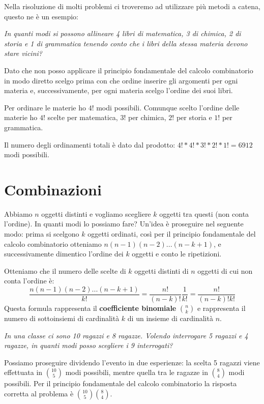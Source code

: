 Nella risoluzione di molti problemi ci troveremo ad utilizzare più metodi a catena, questo ne è un esempio:
\begin{Example}{}{}
    \textit{In quanti modi si possono allineare 4 libri di matematica, 3 di chimica, 2 di storia e 1 di grammatica tenendo conto che i libri della stessa materia devono stare vicini?}

    Dato che non posso applicare il principio fondamentale del calcolo combinatorio in modo diretto scelgo prima con che ordine inserire gli argomenti per ogni materia e, successivamente, per ogni materia scelgo l'ordine dei suoi libri.

    Per ordinare le materie ho $4!$ modi possibili. Comunque scelto l'ordine delle materie ho $4!$ scelte per matematica, $3!$ per chimica, $2!$ per storia e $1!$ per grammatica.

    Il numero degli ordinamenti totali è dato dal prodotto: $4!*4!*3!*2!*1!=6912$ modi possibili.   
\end{Example}

\section{Combinazioni}
Abbiamo $n$ oggetti distinti e vogliamo scegliere $k$ oggetti tra questi (non conta l'ordine). In quanti modi lo possiamo fare? Un'idea è proseguire nel seguente modo: prima si scelgono $k$ oggetti ordinati, così per il principio fondamentale del calcolo combinatorio otteniamo $n(n-1)(n-2)...(n-k+1)$, e successivamente dimentico l'ordine dei $k$ oggetti e conto le ripetizioni.
\begin{redbar}
    Otteniamo che il numero delle scelte di $k$ oggetti distinti di $n$ oggetti di cui non conta l'ordine è:
    \begin{equation*}
        \frac{n(n-1)(n-2)...(n-k+1)}{k!}=\frac{n!}{(n-k)!}\frac{1}{k!}=\frac{n!}{(n-k)!k!}
    \end{equation*}
    Questa formula rappresenta il \textbf{coefficiente binomiale} $\binom{n}{k}$ e rappresenta il numero di sottoinsiemi di cardinalità $k$ di un insieme di cardinalità $n$.
\end{redbar}

\begin{Example}{}{}
    \textit{In una classe ci sono 10 ragazzi e 8 ragazze. Volendo interrogare 5 ragazzi e 4 ragazze, in quanti modi posso scegliere i 9 interrogati?}

    Possiamo proseguire dividendo l'evento in due esperienze: la scelta 5 ragazzi viene effettuata in $\binom{10}{5}$ modi possibili, mentre quella tra le ragazze in $\binom{8}{4}$ modi possibili. Per il principio fondamentale del calcolo combinatorio la risposta corretta al problema è $\binom{10}{5}\binom{8}{4}$.
\end{Example}

